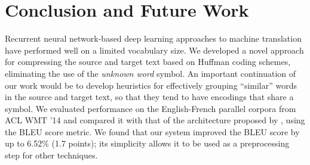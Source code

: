 \section{Conclusion and Future Work}
\label{sec:conclusion}

Recurrent neural network-based deep learning approaches
to machine translation have performed well on a limited vocabulary
size. We developed a novel approach for compressing
the source and target text based on Huffman coding schemes,
eliminating the use of the \emph{unknown word} symbol.
An important continuation of our work would be to develop heuristics for effectively
grouping ``similar'' words in the source and target text, so that they tend to have
encodings that share a symbol. We evaluated performance on the English-French
parallel corpora from ACL WMT '14 and compared it with that of the architecture
proposed by , using the BLEU score metric.
We found that our system improved the BLEU score by up to 6.52\% (1.7 points); its simplicity
allows it to be used as a preprocessing step for other techniques.